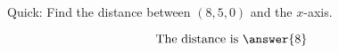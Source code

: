 \documentclass{ximera}
\author{Bart Snapp}
\begin{document}
\begin{exercise}
  Quick: Find the distance between $(8,5,0)$ and the $x$-axis.
  \begin{prompt}
  \[
  \text{The distance is }\answer{8}
  \]
  \end{prompt}
\end{exercise}
\end{document}
